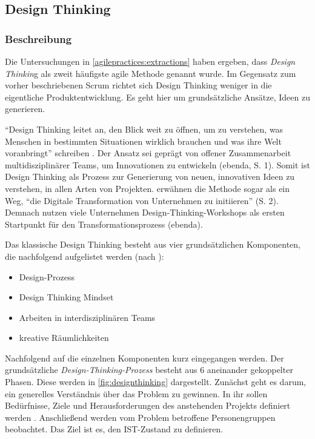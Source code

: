 \subsection{Design Thinking}

\subsubsection{Beschreibung}

Die Untersuchungen in \ref{agilepractices:extractions} haben ergeben, dass \textit{Design Thinkin}g als zweit häufigste agile Methode genannt wurde. Im Gegensatz zum vorher beschriebenen Scrum richtet sich Design Thinking weniger in die eigentliche Produktentwicklung. Es geht hier um grundsätzliche Ansätze, Ideen zu generieren.

``Design Thinking leitet an, den Blick weit zu öffnen, um zu verstehen, was Menschen in bestimmten Situationen wirklich brauchen und was ihre Welt voranbringt''  schreiben . Der Ansatz sei geprägt von offener Zusammenarbeit multidisziplinärer Teams, um Innovationen zu entwickeln (ebenda, S. 1).  Somit ist Design Thinking als Prozess zur Generierung von neuen, innovativen Ideen zu verstehen, in allen Arten von Projekten.  erwähnen die Methode sogar als ein Weg, ``die Digitale Transformation von Unternehmen zu initiieren'' (S. 2). Demnach nutzen viele Unternehmen Design-Thinking-Workshops als ersten Startpunkt für den Transformationsprozess (ebenda).

Das klassische Design Thinking besteht aus vier grundsätzlichen Komponenten, die nachfolgend aufgelistet werden (nach ):

\begin{itemize}[noitemsep, topsep=0pt]
	\item Design-Prozess
	\item Design Thinking Mindset
	\item Arbeiten in interdisziplinären Teams
	\item kreative Räumlichkeiten
\end{itemize}

Nachfolgend auf die einzelnen Komponenten kurz eingegangen werden. Der grundsätzliche \textit{Design-Thinking-Prozess} besteht aus 6 aneinander gekoppelter Phasen. Diese werden in \ref{fig:designthinking} dargestellt. Zunächst geht es darum, ein generelles Verständnis über das Problem zu gewinnen. In ihr sollen Bedürfnisse, Ziele und Herausforderungen des anstehenden Projekts definiert werden \cite[S. 2]{lewrick_design_2018}. Anschließend werden vom Problem betroffene Personengruppen beobachtet. Das Ziel ist es, den IST-Zustand zu definieren.

